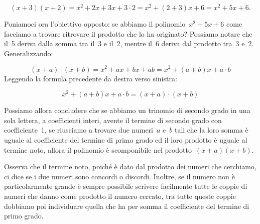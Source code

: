 \[(x+3)(x+2)=x^{2}+2x+3x+3 \cdot 2=x^{2}+(2+3)x+6=x^{2}+5x+6.\]

Poniamoci ora l'obiettivo opposto: se abbiamo il
polinomio~$x^{2}+5x+6$ come facciamo a trovare ritrovare il prodotto
che lo ha originato? Possiamo notare che il~5 deriva dalla somma tra
il~3 e il~2, mentre il~6 deriva dal prodotto tra~3 e~2. Generalizzando:

\[\left(x+a\right)\cdot \left(x+b\right)=
  x^{{2}}+ax+bx+ab=x^{2}+\left(a+b\right)x+a\cdot b\]
Leggendo la formula precedente da destra verso sinistra:

\[x^{{2}}+\left(a+b\right)x+a\cdot b=\left(x+a\right)\cdot\left(x+b\right)\]

Possiamo allora concludere che se abbiamo un trinomio di secondo grado
in una sola lettera, a coefficienti interi, avente il termine di
secondo grado con coefficiente~1, se riusciamo a trovare due numeri~$a$ e~$b$
tali che la loro somma è uguale al
coefficiente del termine di primo grado ed il loro prodotto è uguale
al termine noto, allora il polinomio è scomponibile nel prodotto~$(x+a)(x+b)$.

Osserva che il termine noto, poiché è dato dal prodotto dei numeri
che cerchiamo, ci dice se i due numeri sono concordi o discordi.
Inoltre, se il numero non è particolarmente grande è sempre
possibile scrivere facilmente tutte le coppie di numeri che danno come
prodotto il numero cercato, tra tutte queste coppie dobbiamo poi
individuare quella che ha per somma il coefficiente del termine di
primo grado.

